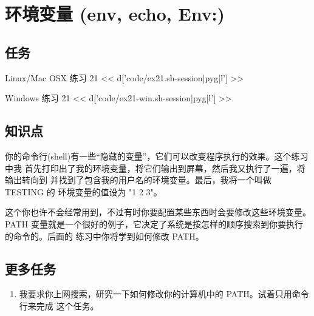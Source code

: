 \chapter{环境变量 (env, echo, Env:)}

\section{任务}

\begin{code}{Linux/Mac OSX 练习 21}
<< d['code/ex21.sh-session|pyg|l'] >>
\end{code}

\begin{code}{Windows 练习 21}
<< d['code/ex21-win.sh-session|pyg|l'] >>
\end{code}

\section{知识点}

你的命令行(shell)有一些“隐藏的变量”，它们可以改变程序执行的效果。这个练习中我
首先打印出了我的环境变量，将它们输出到屏幕，然后我又执行了一遍，将输出转向到 
 并找到了包含我的用户名的环境变量。最后，我将一个叫做 TESTING 的
环境变量的值设为 "1 2 3"。

这个你也许不会经常用到，不过有时你要配置某些东西时会要修改这些环境变量。PATH 
变量就是一个很好的例子，它决定了系统是按怎样的顺序搜索到你要执行的命令的。后面的
练习中你将学到如何修改 PATH。


\section{更多任务}

\begin{enumerate}
\item 我要求你上网搜索，研究一下如何修改你的计算机中的 PATH。试着只用命令行来完成
    这个任务。
\end{enumerate}


